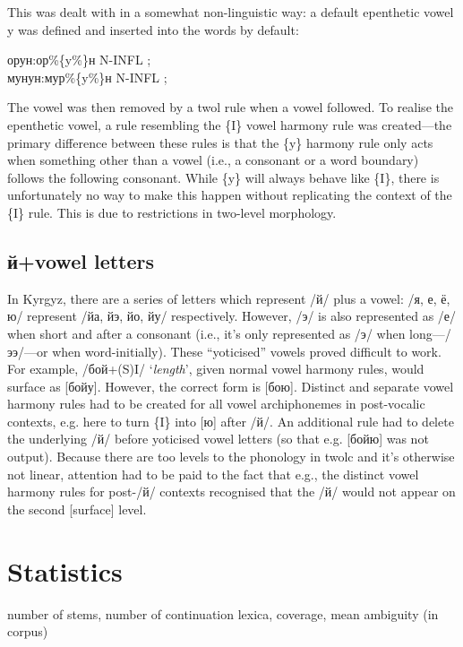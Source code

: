 \documentclass[10pt,a4paper,twocolumn]{article}
\newcommand{\eng}[1]{`{\em #1}'}
\begin{document}
This was dealt with in a somewhat non-linguistic way: a default epenthetic vowel {y} was defined and inserted into the words by default:

\noindent орун:ор\%\{y\%\}н N-INFL ;\\
\noindent мунун:мур\%\{y\%\}н N-INFL ;

The vowel was then removed by a twol rule when a vowel followed.  To realise the epenthetic vowel, a rule resembling the \{I\} vowel harmony rule was created---the primary difference between these rules is that the \{y\} harmony rule only acts when something other than a vowel (i.e., a consonant or a word boundary) follows the following consonant.  While \{y\} will always behave like \{I\}, there is unfortunately no way to make this happen without replicating the context of the \{I\} rule.  This is due to restrictions in two-level morphology.

\subsection{й+vowel letters}

In Kyrgyz, there are a series of letters which represent /й/ plus a vowel: /я, е, ё, ю/ represent /йа, йэ, йо, йу/ respectively.  However, /э/ is also represented as /е/ when short and after a consonant (i.e., it’s only represented as /э/ when long—/ээ/—or when word-initially).  These ``yoticised'' vowels proved difficult to work.  For example, /бой+(S)I/ \eng{length}, given normal vowel harmony rules, would surface as [бойу].  However, the correct form is [бою].  Distinct and separate vowel harmony rules had to be created for all vowel archiphonemes in post-vocalic contexts, e.g. here to turn \{I\} into [ю] after /й/.  An additional rule had to delete the underlying /й/ before yoticised vowel letters (so that e.g. [бойю] was not output).  Because there are too levels to the phonology in twolc and it’s otherwise not linear, attention had to be paid to the fact that e.g., the distinct vowel harmony rules for post-/й/ contexts recognised that the /й/ would not appear on the second [surface] level.

\section{Statistics}

number of stems, number of continuation lexica, coverage, mean ambiguity (in corpus)
\end{document}

